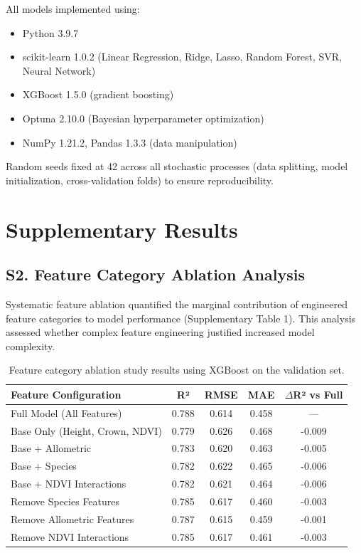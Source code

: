 \documentclass[11pt]{article}
\begin{document}
All models implemented using:
\begin{itemize}
    \item Python 3.9.7
    \item scikit-learn 1.0.2 (Linear Regression, Ridge, Lasso, Random Forest, SVR, Neural Network)
    \item XGBoost 1.5.0 (gradient boosting)
    \item Optuna 2.10.0 (Bayesian hyperparameter optimization)
    \item NumPy 1.21.2, Pandas 1.3.3 (data manipulation)
\end{itemize}

Random seeds fixed at 42 across all stochastic processes (data splitting, model initialization, cross-validation folds) to ensure reproducibility.

\clearpage

\section*{Supplementary Results}

\subsection*{S2. Feature Category Ablation Analysis}

Systematic feature ablation quantified the marginal contribution of engineered feature categories to model performance (Supplementary Table 1). This analysis assessed whether complex feature engineering justified increased model complexity.

\begin{table}[ht!]
    \centering
    \caption{Feature category ablation study results using XGBoost on the validation set.}
    \label{tab:supp_ablation}
    \begin{tabular}{lcccc}
        \toprule
        Feature Configuration & R² & RMSE & MAE & $\Delta$R² vs Full \\
        \midrule
        Full Model (All Features) & 0.788 & 0.614 & 0.458 & --- \\
        Base Only (Height, Crown, NDVI) & 0.779 & 0.626 & 0.468 & -0.009 \\
        Base + Allometric & 0.783 & 0.620 & 0.463 & -0.005 \\
        Base + Species & 0.782 & 0.622 & 0.465 & -0.006 \\
        Base + NDVI Interactions & 0.782 & 0.621 & 0.464 & -0.006 \\
        Remove Species Features & 0.785 & 0.617 & 0.460 & -0.003 \\
        Remove Allometric Features & 0.787 & 0.615 & 0.459 & -0.001 \\
        Remove NDVI Interactions & 0.785 & 0.617 & 0.461 & -0.003 \\
        \bottomrule
    \end{tabular}
\end{table}
\end{document}

